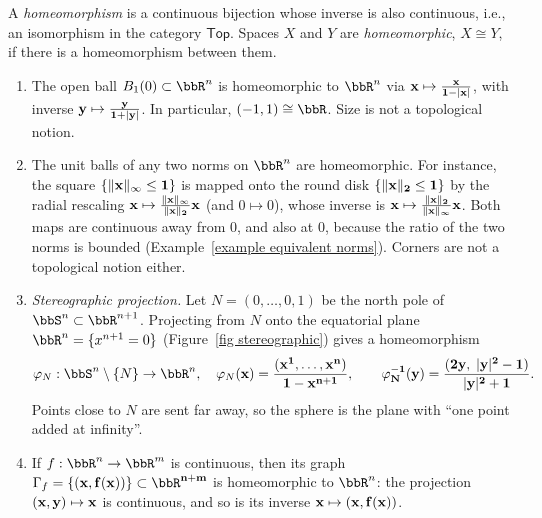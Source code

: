 \begin{defn}[Homeomorphism]
    A \emph{homeomorphism} is a continuous bijection whose inverse is also continuous, i.e., an isomorphism in the category $\mathsf{Top}$. Spaces $X$ and $Y$ are \emph{homeomorphic}, $X\cong Y$, if there is a homeomorphism between them.
\end{defn}

\begin{example}\label{example homeomorphisms}
    \begin{enumerate}
        \item The open ball $B_1(0)\subset\bbR^n$ is homeomorphic to $\bbR^n$ via $\bf{x}\mapsto\frac{\bf{x}}{1-\lvert \bf{x}\rvert}$, with inverse $\bf{y}\mapsto\frac{\bf{y}}{1+\lvert \bf{y}\rvert}$. In particular, $(-1,1)\cong\bbR$. Size is not a topological notion.
        \item The unit balls of any two norms on $\bbR^n$ are homeomorphic. For instance, the square $\{\lVert \bf{x}\rVert_\infty\leq 1\}$ is mapped onto the round disk $\{\lVert \bf{x}\rVert_2\leq1\}$ by the radial rescaling $\bf{x}\mapsto\frac{\lVert \bf{x}\rVert_\infty}{\lVert \bf{x}\rVert_2}\bf{x}$ (and $0\mapsto0$), whose inverse is $\bf{x}\mapsto\frac{\lVert \bf{x}\rVert_2}{\lVert \bf{x}\rVert_\infty}\bf{x}$. Both maps are continuous away from $0$, and also at $0$, because the ratio of the two norms is bounded (Example~\ref{example equivalent norms}). Corners are not a topological notion either.
        \item \emph{Stereographic projection.} Let $N=(0,\ldots,0,1)$ be the north pole of $\bbS^n\subset\bbR^{n+1}$. Projecting from $N$ onto the equatorial plane $\bbR^n=\{x^{n+1}=0\}$ (Figure~\ref{fig stereographic}) gives a homeomorphism
        \[\varphi_N:\bbS^n\setminus\{N\}\to\bbR^n,\quad \varphi_N(\bf{x})=\frac{(x^1,\ldots,x^n)}{1-x^{n+1}},\qquad \varphi_N^{-1}(\bf{y})=\frac{(2\bf{y},\;\lvert \bf{y}\rvert^2-1)}{\lvert \bf{y}\rvert^2+1}.\]
        Points close to $N$ are sent far away, so the sphere is the plane with ``one point added at infinity''.
        \item If $f:\bbR^n\to\bbR^m$ is continuous, then its graph $\Gamma_f=\{(\bf{x},f(\bf{x}))\}\subset\bbR^{n+m}$ is homeomorphic to $\bbR^n$: the projection $(\bf{x},\bf{y})\mapsto \bf{x}$ is continuous, and so is its inverse $\bf{x}\mapsto(\bf{x},f(\bf{x}))$.
    \end{enumerate}
\end{example}

